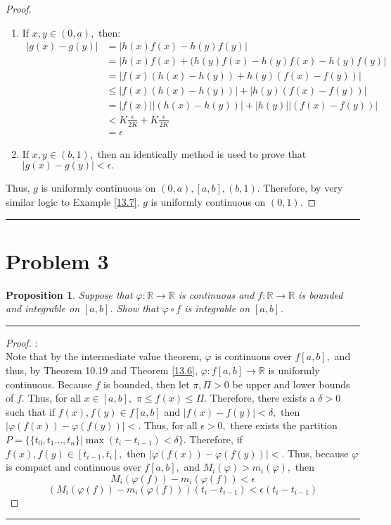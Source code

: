 \documentclass[openany, amssymb, psamsfonts]{amsart}
\newcommand{\bbR}{\mathbb{R}}
\renewcommand{\phi}{\varphi}
\newtheorem{prop}{Proposition}[section]
\theoremstyle{definition}
\numberwithin{equation}{section}
\begin{document}
\begin{proof}
    \begin{enumerate}
        \item If $x,y \in (0,a),$ then: 
        \begin{align*}
            |g(x) - g(y)| &= |h(x)f(x) - h(y)f(y)|\\
            &= |h(x)f(x) + (h(y)f(x) - h(y)f(x) - h(y)f(y)|\\
            &= |f(x)(h(x) - h(y)) + h(y)(f(x) - f(y))|\\
            &\leq |f(x)(h(x) - h(y))| + |h(y)(f(x) - f(y))|\\
            &= |f(x)||(h(x) - h(y))| + |h(y)||(f(x) - f(y))|\\
            &< K\frac{\epsilon}{2K} + K \frac{\epsilon}{2K}\\
            &= \epsilon
        \end{align*}
        \item If $x,y \in (b,1),$ then an identically method is used to prove that $|g(x) - g(y)|< \epsilon.$
    \end{enumerate}
    Thus, $g$ is uniformly continuous on $(0,a), [a,b], (b,1).$ Therefore, by very similar logic to Example \ref{13.7}. $g$ is uniformly continuous on $(0,1).$
\end{proof}\vspace{4pt}     \hrule   \vspace{4pt}

\section*{Problem 3}
\begin{prop}
Suppose that $\phi : \bbR\to\bbR$ is continuous and $f: \bbR \to \bbR$ is bounded and integrable on $[a,b]$.  Show that $\phi \circ f$ is integrable on $[a,b]$.    
\end{prop}
\vspace{4pt}     \hrule   \vspace{4pt}\begin{proof}:\\
Note that by the intermediate value theorem, $\phi$ is continuous over $f[a,b],$ and thus, by Theorem 10.19 and Theorem \ref{13.6}, $\phi: f[a,b]\to \bbR$ is uniformly continuous. Because $f$ is bounded, then let $\pi, \Pi>0$ be upper and lower bounds of $f.$ Thus, for all $x\in [a,b],$ $\pi\leq f(x)\leq \Pi.$ Therefore, there exists a $\delta >0$ such that if $f(x), f(y)\in f[a,b]$ and $|f(x) - f(y)|< \delta,$ then $|\varphi(f(x)) - \phi(f(y))|<.$ Thus, for all $\epsilon>0,$ there exists the partition $P = \{\{t_0, t_1 \dots, t_n\}| \max(t_i - t_{i-1})<\delta\}.$ Therefore, if $f(x), f(y) \in [t_{i-1}, t_i],$ then $|\phi(f(x)) - \phi(f(y))|<.$ Thus, because $\phi$ is compact and continuous over $f[a,b],$ and $M_i(\varphi)> m_i(\phi),$ then \[M_i(\varphi(f)) - m_i(\phi(f)) < \epsilon\]
\[(M_i(\varphi(f)) - m_i(\phi(f)))(t_i - t_{i-1}) < \epsilon(t_i - t_{i-1})\]
\[\]
\end{proof}\vspace{4pt}     \hrule   \vspace{4pt}
\end{document}
